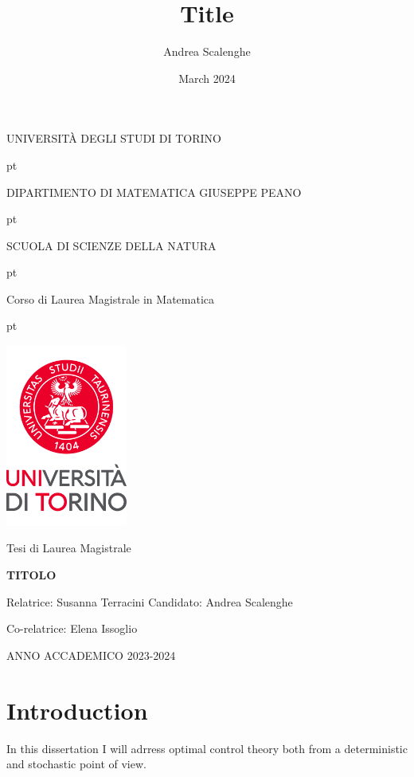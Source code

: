 \documentclass[12pt,a4paper]{book}
\title{Title}
\author{Andrea Scalenghe}
\date{March 2024}
\numberwithin{theorem}{section}
\numberwithin{definition}{section}
\numberwithin{example}{section}
\numberwithin{exercise}{section}
\begin{document}
\thispagestyle{empty}

\centerline {\Large{\textsc{ UNIVERSIT\`A DEGLI STUDI DI TORINO}}}
 pt

\centerline {\Large{\textsc DIPARTIMENTO DI MATEMATICA GIUSEPPE PEANO}}

 pt

\centerline {{\textsc SCUOLA DI SCIENZE DELLA NATURA}}

 pt

\centerline {\Large{\textsc Corso di Laurea Magistrale in Matematica}}
 pt





\centerline {\includegraphics[width=4cm]{logo_new_2022.png}}

\vskip 1.2cm

\centerline {\normalsize {Tesi di Laurea  Magistrale}} 

\vskip 0.7cm

\centerline {\Large {\bf TITOLO}}

\vskip 1.7cm

\noindent Relatrice: Susanna Terracini
\hfill  {Candidato: Andrea Scalenghe}

\noindent Co-relatrice: Elena Issoglio


\vskip 2.7cm


\centerline{ANNO ACCADEMICO 2023-2024}


\newpage

\tableofcontents

\newpage

\chapter{Introduction}

In this dissertation I will adrress optimal control theory both from a deterministic and stochastic point of view. 
\end{document}
